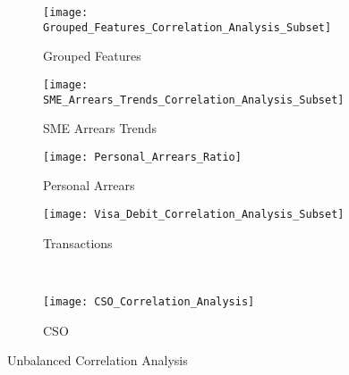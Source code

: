 \begin{figure}[H]
	\centering
		\begin{subfigure}[b]{0.32\textwidth}
			\captionsetup{font=scriptsize}
			\texttt{[image: Grouped\_Features\_Correlation\_Analysis\_Subset]}\caption{Grouped Features}\label{fig:groupedFeaturesCorrelation}
		\end{subfigure} 
		\begin{subfigure}[b]{0.32\textwidth}
			\captionsetup{font=scriptsize}
			\texttt{[image: SME\_Arrears\_Trends\_Correlation\_Analysis\_Subset]}
			\caption{SME Arrears Trends}\label{fig:smeArrearsCorrelation}
		\end{subfigure} 
		\begin{subfigure}[b]{0.32\textwidth}
			\captionsetup{font=scriptsize}
			\texttt{[image: Personal\_Arrears\_Ratio]}
			\caption{Personal Arrears}\label{fig:personalArrearsCorrelation}
		\end{subfigure} 
	\medskip
	\begin{subfigure}[b]{0.32\textwidth}
		\captionsetup{font=scriptsize}
		\texttt{[image: Visa\_Debit\_Correlation\_Analysis\_Subset]}
		\caption{Transactions}\label{fig:transVisaCorrelation}
	\end{subfigure} ~\quad
	\begin{subfigure}[b]{0.32\textwidth}
		\captionsetup{font=scriptsize}
		\texttt{[image: CSO\_Correlation\_Analysis]}
		\caption{CSO}\label{fig:CSOCorrelation}
	\end{subfigure}
\caption{Unbalanced Correlation Analysis}
\label{fig:unbal_corr_analysis}
\end{figure}
	
